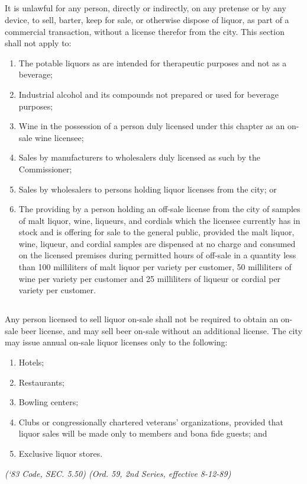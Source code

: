 \subsection{}
It is unlawful for any person, directly or indirectly, on any pretense or by any device, to sell, barter, keep for sale, or otherwise dispose of liquor, as part of a commercial transaction, without a license therefor from the city. This section shall not apply to:
\begin{enumerate}[{\indent}1)]
    \item The potable liquors as are intended for therapeutic purposes and not as a beverage; 
    \item Industrial alcohol and its compounds not prepared or used for beverage purposes; 
    \item Wine in the possession of a person duly licensed under this chapter as an on-sale wine licensee;
    \item Sales by manufacturers to wholesalers duly licensed as such by the Commissioner; 
    \item Sales by wholesalers to persons holding liquor licenses from the city; or 
    \item The providing by a person holding an off-sale license from the city of samples of malt liquor, wine, liqueurs, and cordials which the licensee currently has in stock and is offering for sale to the general public, provided the malt liquor, wine, liqueur, and cordial samples are dispensed at no charge and consumed on the licensed premises during permitted hours of off-sale in a quantity less than 100 milliliters of malt liquor per variety per customer, 50 milliliters of wine per variety per customer and 25 milliliters of liqueur or cordial per variety per customer.
\end{enumerate}
\subsection{}
Any person licensed to sell liquor on-sale shall not be required to obtain an on-sale beer license, and may sell beer on-sale without an additional license.  The city may issue annual on-sale liquor licenses only to the following:
\begin{enumerate}[{\indent}1)]
    \item Hotels; 
    \item Restaurants; 
    \item Bowling centers; 
    \item Clubs or congressionally chartered veterans’ organizations, provided that liquor sales will be made only to members and bona fide guests; and 
    \item Exclusive liquor stores.
\end{enumerate}
\emph{(‘83 Code, SEC. 5.50) (Ord. 59, 2nd Series, effective 8-12-89)}
